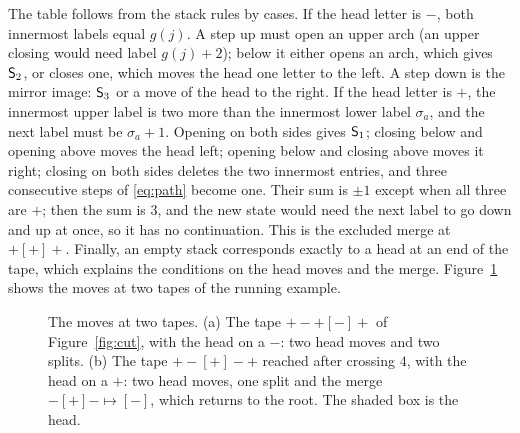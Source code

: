 The table follows from the stack rules by cases. If the head letter is $-$, both innermost labels equal $g(j)$. A step
up must open an upper arch (an upper closing would need label $g(j)+2$); below it either opens an arch, which gives
$\mathsf{S}_2$, or closes one, which moves the head one letter to the left. A step down is the mirror image: $\mathsf{S}_3$ or a
move of the head to the right. If the head letter is $+$, the innermost upper label is two more than the innermost
lower label $\sigma_a$, and the next label must be $\sigma_a+1$. Opening on both sides gives $\mathsf{S}_1$; closing below and
opening above moves the head left; opening below and closing above moves it right; closing on both sides deletes the
two innermost entries, and three consecutive steps of \eqref{eq:path} become one. Their sum is $\pm1$ except when
all three are $+$; then the sum is $3$, and the new state would need the next label to go down and up at once, so it
has no continuation. This is the excluded merge at $+[+]+$. Finally, an empty stack corresponds exactly to a head at
an end of the tape, which explains the conditions on the head moves and the merge. Figure~\ref{fig:moves} shows the
moves at two tapes of the running example.

\begin{figure}[htb]
\centering
{}
\caption{The moves at two tapes. (a) The tape $+-+[-]+$ of Figure~\ref{fig:cut}, with the head on a $-$: two head
moves and two splits. (b) The tape $+-[+]-+$ reached after crossing $4$, with the head on a $+$: two head moves, one
split and the merge $-[+]-\mapsto[-]$, which returns to the root. The shaded box is the head.}
\label{fig:moves}
\end{figure}

